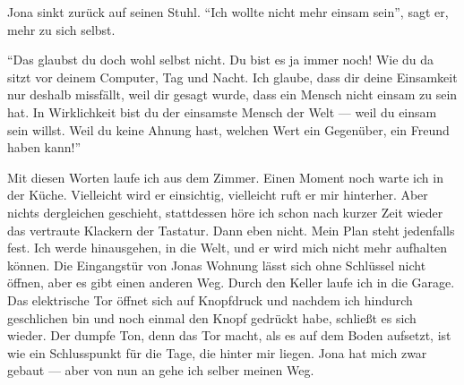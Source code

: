 Jona sinkt zurück auf seinen Stuhl. "`Ich wollte nicht mehr einsam sein"', sagt er, mehr zu sich selbst.

"`Das glaubst du doch wohl selbst nicht. Du bist es ja immer noch! Wie du da sitzt vor deinem Computer, Tag und Nacht. Ich glaube, dass dir deine Einsamkeit nur deshalb missfällt, weil dir gesagt wurde, dass ein Mensch nicht einsam zu sein hat. In Wirklichkeit bist du der einsamste Mensch der Welt --- weil du einsam sein willst. Weil du keine Ahnung hast, welchen Wert ein Gegenüber, ein Freund haben kann!"'

Mit diesen Worten laufe ich aus dem Zimmer. Einen Moment noch warte ich in der Küche. Vielleicht wird er einsichtig, vielleicht ruft er mir hinterher. Aber nichts dergleichen geschieht, stattdessen höre ich schon nach kurzer Zeit wieder das vertraute Klackern der Tastatur. Dann eben nicht. Mein Plan steht jedenfalls fest. Ich werde hinausgehen, in die Welt, und er wird mich nicht mehr aufhalten können. Die Eingangstür von Jonas Wohnung lässt sich ohne Schlüssel nicht öffnen, aber es gibt einen anderen Weg. Durch den Keller laufe ich in die Garage. Das elektrische Tor öffnet sich auf Knopfdruck und nachdem ich hindurch geschlichen bin und noch einmal den Knopf gedrückt habe, schließt es sich wieder. Der dumpfe Ton, denn das Tor macht, als es auf dem Boden aufsetzt, ist wie ein Schlusspunkt für die Tage, die hinter mir liegen. Jona hat mich zwar gebaut --- aber von nun an gehe ich selber meinen Weg.

